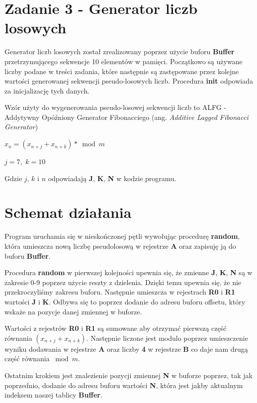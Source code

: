 \documentclass{article}
\begin{document}
\newpage



\section{Zadanie 3 - Generator liczb losowych}

Generator liczb losowych został zrealizowany poprzez użycie buforu \textbf{Buffer} przetrzymującego sekwencje 10 elementów w pamięci. Początkowo są używane liczby podane w treści zadania, które następnie są zastępowane przez kolejne wartości generowanej sekwencji pseudo-losowych liczb. Procedura \textbf{init} odpowiada za inicjalizację tych danych.

Wzór użyty do wygenerowania pseudo-losowej sekwencji liczb to ALFG - Addytywny Opóźniony Generator Fibonacciego (ang. \textit{Additive Lagged Fibonacci Generator})

$x_n=(x_{n+j}+x_{n+k}) * \bmod{m}$

$j = 7,$
$k = 10$

Gdzie $j$, $k$ i $n$ odpowiadają \textbf{J}, \textbf{K}, \textbf{N} w kodzie programu.

\section{Schemat działania}

Program uruchamia się w nieskończonej pętli wywołując procedurę \textbf{random}, która umieszcza nową liczbę pseudolosową w rejestrze \textbf{A} oraz zapisuję ją do buforu \textbf{Buffer}.

Procedura \textbf{random} w pierwszej kolejności upewnia się, że zmienne \textbf{J}, \textbf{K}, \textbf{N} są w zakresie 0-9 poprzez użycie reszty z dzielenia. Dzięki temu upewnia się, że nie przekroczyliśmy zakresu buforu. Następnie umieszcza w rejestrach \textbf{R0} i \textbf{R1} wartości \textbf{J} i \textbf{K}. Odbywa się to poprzez dodanie do adresu buforu offsetu, który wskaże na pozycje danej zmiennej w buforze.

Wartości z rejestrów \textbf{R0} i \textbf{R1} są sumowane aby otrzymać pierwszą część równania $(x_{n+j}+x_{n+k})$. Następnie liczone jest modulo poprzez umieszczenie wyniku dodawania w rejestrze \textbf{A} oraz liczby \textbf{4} w rejestrze \textbf{B} co daje nam drugą część równania $\bmod{m}$.

Ostatnim krokiem jest znalezienie pozycji zmiennej \textbf{N} w buforze poprzez, tak jak poprzednio, dodanie do adresu buforu wartości \textbf{N}, która jest jakby aktualnym indeksem naszej tablicy \textbf{Buffer}.
\end{document}
